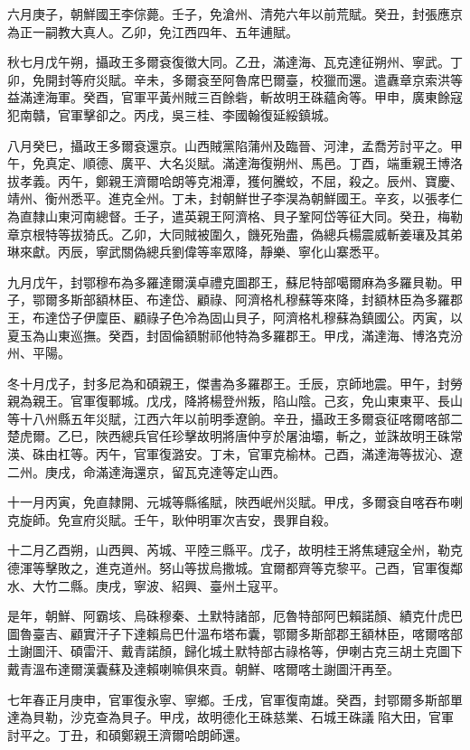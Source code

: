 \begin{pinyinscope}
六月庚子，朝鮮國王李倧薨。壬子，免滄州、清苑六年以前荒賦。癸丑，封張應京為正一嗣教大真人。乙卯，免江西四年、五年逋賦。

秋七月戊午朔，攝政王多爾袞復徵大同。乙丑，滿達海、瓦克達征朔州、寧武。丁卯，免開封等府災賦。辛未，多爾袞至阿魯席巴爾臺，校獵而還。遣纛章京索洪等益滿達海軍。癸酉，官軍平黃州賊三百餘砦，斬故明王硃蘊肏等。甲申，廣東餘寇犯南贛，官軍擊卻之。丙戌，吳三桂、李國翰復延綏鎮城。

八月癸巳，攝政王多爾袞還京。山西賊黨陷蒲州及臨晉、河津，孟喬芳討平之。甲午，免真定、順德、廣平、大名災賦。滿達海復朔州、馬邑。丁酉，端重親王博洛拔孝義。丙午，鄭親王濟爾哈朗等克湘潭，獲何騰蛟，不屈，殺之。辰州、寶慶、靖州、衡州悉平。進克全州。丁未，封朝鮮世子李淏為朝鮮國王。辛亥，以張孝仁為直隸山東河南總督。壬子，遣英親王阿濟格、貝子鞏阿岱等征大同。癸丑，梅勒章京根特等拔猗氏。乙卯，大同賊被圍久，饑死殆盡，偽總兵楊震威斬姜瓖及其弟琳來獻。丙辰，寧武關偽總兵劉偉等率眾降，靜樂、寧化山寨悉平。

九月戊午，封鄂穆布為多羅達爾漢卓禮克圖郡王，蘇尼特部噶爾麻為多羅貝勒。甲子，鄂爾多斯部額林臣、布達岱、顧祿、阿濟格札穆蘇等來降，封額林臣為多羅郡王，布達岱子伊廩臣、顧祿子色冷為固山貝子，阿濟格札穆蘇為鎮國公。丙寅，以夏玉為山東巡撫。癸酉，封固倫額駙祁他特為多羅郡王。甲戌，滿達海、博洛克汾州、平陽。

冬十月戊子，封多尼為和碩親王，傑書為多羅郡王。壬辰，京師地震。甲午，封勞親為親王。官軍復鄆城。戊戌，降將楊登州叛，陷山陰。己亥，免山東東平、長山等十八州縣五年災賦，江西六年以前明季遼餉。辛丑，攝政王多爾袞征喀爾喀部二楚虎爾。乙巳，陜西總兵官任珍擊故明將唐仲亨於屠油壩，斬之，並誅故明王硃常渶、硃由杠等。丙午，官軍復潞安。丁未，官軍克榆林。己酉，滿達海等拔沁、遼二州。庚戌，命滿達海還京，留瓦克達等定山西。

十一月丙寅，免直隸開、元城等縣徭賦，陜西岷州災賦。甲戌，多爾袞自喀吞布喇克旋師。免宣府災賦。壬午，耿仲明軍次吉安，畏罪自殺。

十二月乙酉朔，山西興、芮城、平陸三縣平。戊子，故明桂王將焦璉寇全州，勒克德渾等擊敗之，進克道州。努山等拔烏撒城。宜爾都齊等克黎平。己酉，官軍復鄰水、大竹二縣。庚戌，寧波、紹興、臺州土寇平。

是年，朝鮮、阿霸垓、烏硃穆秦、土默特諸部，厄魯特部阿巴賴諾顏、績克什虎巴圖魯臺吉、顧實汗子下達賴烏巴什溫布塔布囊，鄂爾多斯部郡王額林臣，喀爾喀部土謝圖汗、碩雷汗、戴青諾顏，歸化城土默特部古祿格等，伊喇古克三胡土克圖下戴青溫布達爾漢囊蘇及達賴喇嘛俱來貢。朝鮮、喀爾喀土謝圖汗再至。

七年春正月庚申，官軍復永寧、寧鄉。壬戌，官軍復南雄。癸酉，封鄂爾多斯部單達為貝勒，沙克查為貝子。甲戌，故明德化王硃慈業、石城王硃議陷大田，官軍討平之。丁丑，和碩鄭親王濟爾哈朗師還。


\end{pinyinscope}
